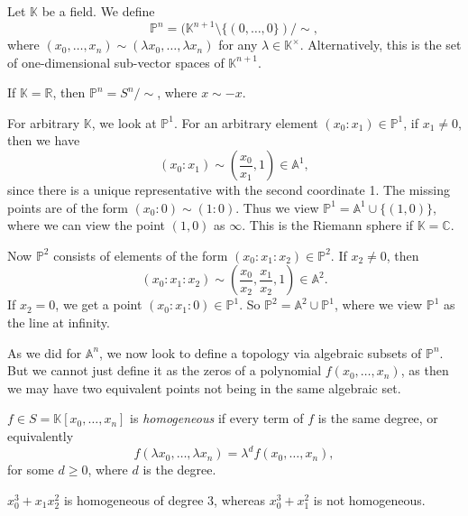\documentclass[12pt]{article}
\begin{document}

\begin{definition}
	Let $\mathbb{K}$ be a field. We define
	\[
		\mathbb{P}^n = (\mathbb{K}^{n+1} \setminus \{(0, \ldots, 0\}) / \sim,
	\]
	where $(x_0, \ldots, x_n) \sim (\lambda x_0, \ldots, \lambda x_n)$ for any  $\lambda \in \mathbb{K}^\times$. Alternatively, this is the set of one-dimensional sub-vector spaces of $\mathbb{K}^{n+1}$.
\end{definition}

\begin{remark}
	If $\mathbb{K} = \mathbb{R}$, then $\mathbb{P}^n = S^n / \sim$, where $x \sim -x$.
\end{remark}

For arbitrary $\mathbb{K}$, we look at $\mathbb{P}^1$. For an arbitrary element $(x_0: x_1) \in \mathbb{P}^1$, if $x_1 \neq 0$, then we have
\[
	(x_0 : x_1) \sim \left( \frac{x_0}{x_1}, 1\right) \in \mathbb{A}^1,
\]
since there is a unique representative with the second coordinate 1. The missing points are of the form $(x_0 : 0) \sim (1 : 0)$. Thus we view $\mathbb{P}^1 = \mathbb{A}^1 \cup\{(1, 0)\}$, where we can view the point $(1, 0)$ as $\infty$. This is the Riemann sphere if $\mathbb{K} = \mathbb{C}$.

Now $\mathbb{P}^2$ consists of elements of the form $(x_0 : x_1 : x_2) \in \mathbb{P}^2$. If $x_2 \neq 0$, then
\[
	(x_0 : x_1 : x_2) \sim \left( \frac{x_0}{x_2}, \frac{x_1}{x_2}, 1 \right) \in \mathbb{A}^2.
\]
If $x_2 = 0$, we get a point $(x_0 : x_1: 0) \in \mathbb{P}^1$. So $\mathbb{P}^2 = \mathbb{A}^2 \cup \mathbb{P}^1$, where we view $\mathbb{P}^1$ as the line at infinity.

As we did for $\mathbb{A}^n$, we now look to define a topology via algebraic subsets of $\mathbb{P}^n$. But we cannot just define it as the zeros of a polynomial $f(x_0, \ldots, x_n)$, as then we may have two equivalent points not being in the same algebraic set.

\begin{definition}
	$f \in S = \mathbb{K}[x_0, \ldots, x_n]$ is \emph{homogeneous} if every term of $f$ is the same degree, or equivalently 
	\[
	f(\lambda x_0, \ldots, \lambda x_n) = \lambda^d f(x_0, \ldots, x_n),
	\]
	for some $d \geq 0$, where $d$ is the degree.
\end{definition}

\begin{exbox}
	$x_0^3 + x_1x_2^2$ is homogeneous of degree 3, whereas $x_0^3 + x_1^2$ is not homogeneous.
\end{exbox}
\end{document}
